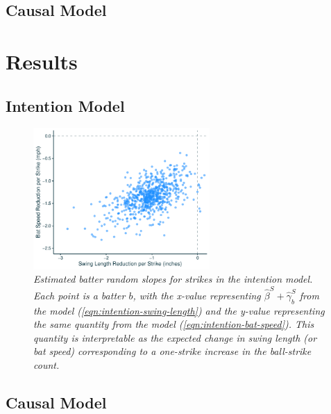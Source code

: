 \documentclass{article}
\begin{document}
    \subsection{Causal Model}
    \label{sec:methods-causal}

  \section{Results}
  \label{sec:results}

    \subsection{Intention Model}
    \label{sec:results-intention}

      \begin{figure}
        \centering
        \includegraphics[width = 0.6\textwidth]{../../figures/approach.pdf}
        \caption{\it Estimated batter random slopes for strikes in the intention model. Each point is a batter $b$, with the x-value representing $\hat\beta^S + \hat\gamma^S_b$ from the model (\ref{eqn:intention-swing-length}) and the y-value representing the same quantity from the model (\ref{eqn:intention-bat-speed}). This quantity is interpretable as the expected change in swing length (or bat speed) corresponding to a one-strike increase in the ball-strike count.}
        \label{fig:approach}
      \end{figure}

    \subsection{Causal Model}
    \label{sec:results-causal}
\end{document}

